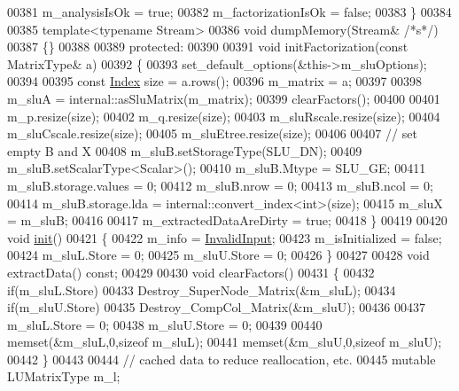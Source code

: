 \begin{DoxyCode}
00381       m\_analysisIsOk = \textcolor{keyword}{true};
00382       m\_factorizationIsOk = \textcolor{keyword}{false};
00383     \}
00384     
00385     \textcolor{keyword}{template}<\textcolor{keyword}{typename} Stream>
00386     \textcolor{keywordtype}{void} dumpMemory(Stream& \textcolor{comment}{/*s*/})
00387     \{\}
00388     
00389   \textcolor{keyword}{protected}:
00390     
00391     \textcolor{keywordtype}{void} initFactorization(\textcolor{keyword}{const} MatrixType& a)
00392     \{
00393       set\_default\_options(&this->m\_sluOptions);
00394       
00395       \textcolor{keyword}{const} \hyperlink{namespace_eigen_a62e77e0933482dafde8fe197d9a2cfde}{Index} size = a.rows();
00396       m\_matrix = a;
00397 
00398       m\_sluA = internal::asSluMatrix(m\_matrix);
00399       clearFactors();
00400 
00401       m\_p.resize(size);
00402       m\_q.resize(size);
00403       m\_sluRscale.resize(size);
00404       m\_sluCscale.resize(size);
00405       m\_sluEtree.resize(size);
00406 
00407       \textcolor{comment}{// set empty B and X}
00408       m\_sluB.setStorageType(SLU\_DN);
00409       m\_sluB.setScalarType<Scalar>();
00410       m\_sluB.Mtype          = SLU\_GE;
00411       m\_sluB.storage.values = 0;
00412       m\_sluB.nrow           = 0;
00413       m\_sluB.ncol           = 0;
00414       m\_sluB.storage.lda    = internal::convert\_index<int>(size);
00415       m\_sluX                = m\_sluB;
00416       
00417       m\_extractedDataAreDirty = \textcolor{keyword}{true};
00418     \}
00419     
00420     \textcolor{keywordtype}{void} \hyperlink{structinit}{init}()
00421     \{
00422       m\_info = \hyperlink{group__enums_gga85fad7b87587764e5cf6b513a9e0ee5ea945604f62795ffc70aedf2bd12ea0434}{InvalidInput};
00423       m\_isInitialized = \textcolor{keyword}{false};
00424       m\_sluL.Store = 0;
00425       m\_sluU.Store = 0;
00426     \}
00427     
00428     \textcolor{keywordtype}{void} extractData() \textcolor{keyword}{const};
00429 
00430     \textcolor{keywordtype}{void} clearFactors()
00431     \{
00432       \textcolor{keywordflow}{if}(m\_sluL.Store)
00433         Destroy\_SuperNode\_Matrix(&m\_sluL);
00434       \textcolor{keywordflow}{if}(m\_sluU.Store)
00435         Destroy\_CompCol\_Matrix(&m\_sluU);
00436 
00437       m\_sluL.Store = 0;
00438       m\_sluU.Store = 0;
00439 
00440       memset(&m\_sluL,0,\textcolor{keyword}{sizeof} m\_sluL);
00441       memset(&m\_sluU,0,\textcolor{keyword}{sizeof} m\_sluU);
00442     \}
00443 
00444     \textcolor{comment}{// cached data to reduce reallocation, etc.}
00445     \textcolor{keyword}{mutable} LUMatrixType m\_l;

\end{DoxyCode}
